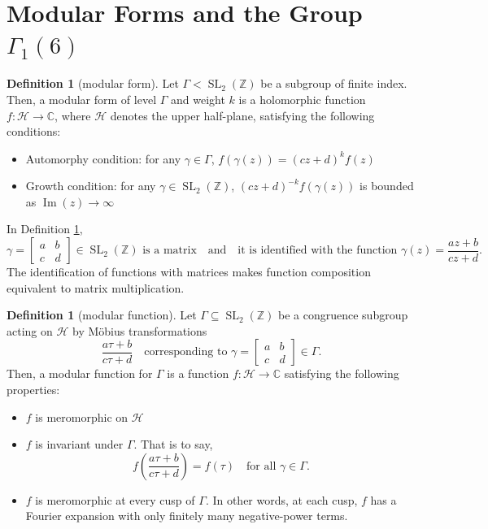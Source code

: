 \documentclass[12pt, a4paper]{amsart}
\theoremstyle{definition}
\numberwithin{theorem}{section}
\newtheorem{definition}[theorem]{Definition}
\begin{document}
\section{Modular Forms and the Group $\Gamma_1\left(6\right)$}
\begin{definition}[modular form]\label{definition of modular form} Let $\Gamma<\operatorname{SL}_2\left(\mathbb{Z}\right)$ be a subgroup of finite index. Then, a modular form of level $\Gamma$ and weight $k$ is a holomorphic function $f:\mathcal{H}\to\mathbb{C}$, where $\mathcal{H}$ denotes the upper half-plane, satisfying the following conditions:
\begin{itemize}
    \itemsep 0em
    \item Automorphy condition: for any $\gamma\in \Gamma$, $f\left(\gamma\left(z\right)\right)=\left(cz+d\right)^kf\left(z\right)$
    \item Growth condition: for any $\gamma\in\operatorname{SL}_2\left(\mathbb{Z}\right)$, $\left(cz+d\right)^{-k}f\left(\gamma\left(z\right)\right)$ is bounded as $\operatorname{Im}\left(z\right)\to\infty$
\end{itemize}
\end{definition}
In Definition \ref{definition of modular form}, \[\gamma=\begin{bmatrix}
    a& b\\c&d
\end{bmatrix}\in\operatorname{SL}_2\left(\mathbb{Z}\right)\text{ is a matrix}\quad\text{and}\quad\text{it is identified with the function }\gamma\left(z\right)=\frac{az+b}{cz+d}.\]
The identification of functions with matrices makes function composition equivalent to matrix multiplication.
\begin{definition}[modular function] Let $\Gamma\subseteq\operatorname{SL}_2\left(\mathbb{Z}\right)$ be a congruence subgroup acting on $\mathcal{H}$ by Möbius transformations \[\frac{a\tau+b}{c\tau+d}\quad\text{corresponding to }\gamma=\begin{bmatrix}
    a&b\\c&d
\end{bmatrix}\in \Gamma.\]
Then, a modular function for $\Gamma$ is a function $f:\mathcal{H}\to\mathbb{C}$ satisfying the following properties:
\begin{itemize}
    \itemsep 0em
    \item $f$ is meromorphic on $\mathcal{H}$
    \item $f$ is invariant under $\Gamma$. That is to say, \[f\left(\frac{a\tau+b}{c\tau+d}\right)=f\left(\tau\right)\quad\text{for all }\gamma\in \Gamma.\]
    \item $f$ is meromorphic at every cusp of $\Gamma$. In other words, at each cusp, $f$ has a Fourier expansion with only finitely many negative-power terms.
\end{itemize}
\end{definition}
\end{document}
